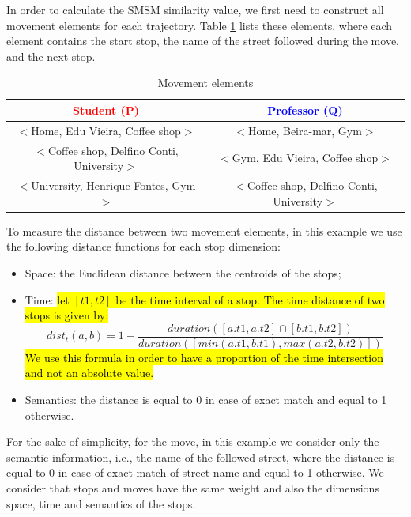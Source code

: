 \documentclass[12pt]{article}
\begin{document}
In order to calculate the SMSM similarity value, we first need to construct all movement elements for each trajectory. Table \ref{tab:SMSM_tuples} lists these elements, where each element contains the start stop, the name of the street followed during the move, and the next stop. 

\begin{table}[h!]
\scriptsize
  \centering
  \begin{tabular}{|c|c|}
  	\hline
		\textcolor{Red}{\textbf{Student (P)}} & \textcolor{Blue}{\textbf{Professor (Q)}}\\
  	\hline
      $<$Home, Edu Vieira, Coffee shop$>$&$<$Home, Beira-mar, Gym$>$\\
      $<$Coffee shop, Delfino Conti, University$>$&$<$Gym, Edu Vieira, Coffee shop$>$\\
      $<$University, Henrique Fontes, Gym$>$&$<$Coffee shop, Delfino Conti, University$>$\\
  	\hline
  \end{tabular}
  \label{tab:wrong}
  \caption{Movement elements}
  \label{tab:SMSM_tuples}
\end{table}

To measure the distance between two movement elements, in this example we use the following distance functions for each stop dimension:
\begin{itemize}
  \item Space: the Euclidean distance between the centroids of the stops;
      \item  Time:  \hl{let $[t1, t2]$ be the time interval of a stop. The time distance of two stops is given by:}
\begin{equation} \label{func:time_interval}
	dist_t(a, b) = 1 - \dfrac{duration([a.t1, a.t2] \cap [b.t1, b.t2])}{duration([min(a.t1, b.t1), max(a.t2, b.t2)])}
\end{equation}
\hl{We use this formula in order to have a proportion of the time intersection and not an absolute value.}
  \item Semantics: the distance is equal to 0 in case of exact match and equal to 1 otherwise.
\end{itemize}

For the sake of simplicity, for the move, in this example we consider only the semantic information, i.e., the name of the followed street, where the distance is equal to 0 in case of exact match of street name and equal to 1 otherwise.
We consider that stops and moves have the same weight and also the dimensions space, time and semantics of the stops.
\end{document}
